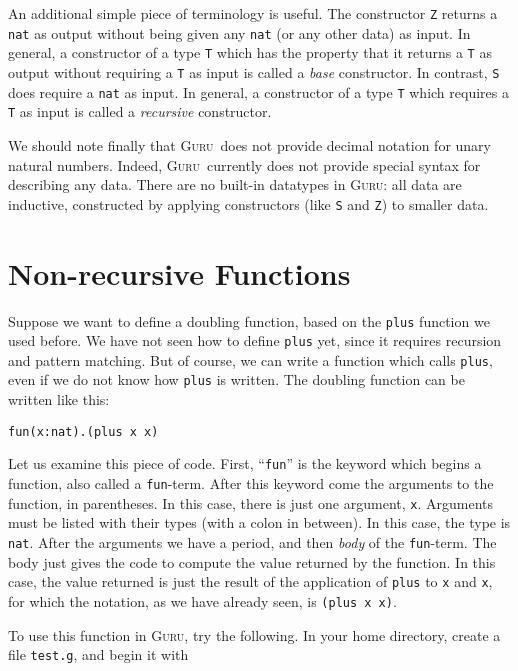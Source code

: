 \documentclass{book}[12pt]
\newcommand{\guru}[0]{\textsc{Guru}}
\begin{document}
An additional simple piece of terminology is useful.  The constructor
\texttt{Z} returns a \texttt{nat} as output without being given any
\texttt{nat} (or any other data) as input.  In general, a constructor
of a type \texttt{T} which has the property that it returns a
\texttt{T} as output without requiring a \texttt{T} as input is called
a \emph{base} constructor.  In contrast, \texttt{S} does require a
\texttt{nat} as input.  In general, a constructor of a type \texttt{T}
which requires a \texttt{T} as input is called a \emph{recursive}
constructor.

We should note finally that \guru\ does not provide decimal notation
for unary natural numbers.  Indeed, \guru\ currently does not provide
special syntax for describing any data.  There are no built-in
datatypes in \guru: all data are inductive, constructed by applying
constructors (like \texttt{S} and \texttt{Z}) to smaller data.

\section{Non-recursive Functions}

Suppose we want to define a doubling function, based on the
\texttt{plus} function we used before.  We have not seen how to define
\texttt{plus} yet, since it requires recursion and pattern matching.
But of course, we can write a function which calls \texttt{plus},
even if we do not know how \texttt{plus} is written.  The doubling
function can be written like this:

\begin{verbatim}
fun(x:nat).(plus x x)
\end{verbatim}

\noindent Let us examine this piece of code.  First, ``\texttt{fun}''
is the keyword which begins a function, also called a
\texttt{fun}-term.  After this keyword come the arguments to the
function, in parentheses.  In this case, there is just one argument,
\texttt{x}.  Arguments must be listed with their types (with a colon
in between).  In this case, the type is \texttt{nat}.  After the
arguments we have a period, and then \emph{body} of the
\texttt{fun}-term.  The body just gives the code to compute the value
returned by the function.  In this case, the value returned is just
the result of the application of \texttt{plus} to \texttt{x} and
\texttt{x}, for which the notation, as we have already seen, is
\texttt{(plus x x)}.

To use this function in \guru, try the following.  In your home
directory, create a file \texttt{test.g}, and begin it with
\end{document}
